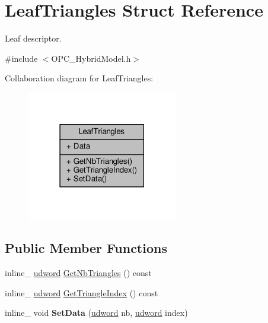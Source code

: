 \hypertarget{structLeafTriangles}{}\section{Leaf\+Triangles Struct Reference}
\label{structLeafTriangles}


Leaf descriptor.  




{\ttfamily \#include $<$O\+P\+C\+\_\+\+Hybrid\+Model.\+h$>$}



Collaboration diagram for Leaf\+Triangles\+:
\nopagebreak
\begin{figure}[H]
\begin{center}
\leavevmode
\includegraphics[width=186pt]{d4/d5b/structLeafTriangles__coll__graph}
\end{center}
\end{figure}
\subsection*{Public Member Functions}
\begin{DoxyCompactItemize}
\item 
inline\+\_\+ \hyperlink{IceTypes_8h_a44c6f1920ba5551225fb534f9d1a1733}{udword} \hyperlink{structLeafTriangles_ae4e2a9f6f0c02d7cb40d9bb625603557}{Get\+Nb\+Triangles} () const 
\item 
inline\+\_\+ \hyperlink{IceTypes_8h_a44c6f1920ba5551225fb534f9d1a1733}{udword} \hyperlink{structLeafTriangles_ae5274c22470a13c5013a6b4d6b2317af}{Get\+Triangle\+Index} () const 
\item 
inline\+\_\+ void {\bfseries Set\+Data} (\hyperlink{IceTypes_8h_a44c6f1920ba5551225fb534f9d1a1733}{udword} nb, \hyperlink{IceTypes_8h_a44c6f1920ba5551225fb534f9d1a1733}{udword} index)\hypertarget{structLeafTriangles_aafba126434e6ed3b462615d95d25f74d}{}\label{structLeafTriangles_aafba126434e6ed3b462615d95d25f74d}

\end{DoxyCompactItemize}
